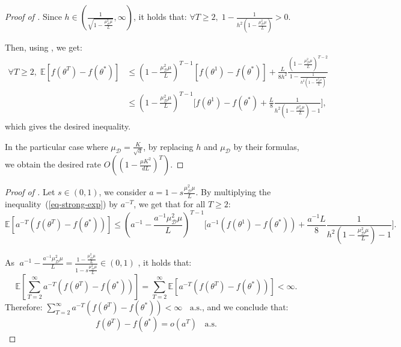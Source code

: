 \documentclass{article} %
\begin{document}
\begin{proof}[Proof of ]
Since $h \in \left(\frac{1}{\sqrt{1-\frac{\mu_{\mathcal{D}}^2 \mu}{L}}}, \infty \right)$, it holds that: $ \forall T \ge 2, \;  1-\frac{1}{h^2\left(1-\frac{\mu_{\mathcal{D}}^2 \mu}{L}\right)   } >0.$

Then, using , we get: 
\begin{align*}
\forall T \ge 2, \; 
\mathbb{E}[f(\theta^{T})-f(\theta^{*})  ]  &\leq\left(1-\frac{\mu_{\mathcal{D}}^2 \mu}{L}\right)^{T-1} [f(\theta^{1})-f(\theta^{*})  ]+\frac{L}{8h^2} \frac{ \left(1-\frac{\mu_{\mathcal{D}}^2 \mu}{L}\right)^{T-2}}{1- \frac{1}{h^2\left(1-\frac{\mu_{\mathcal{D}}^2 \mu}{L}\right)   } }   \\
&\label{eq-strong}\leq \left(1-\frac{\mu_{\mathcal{D}}^2 \mu}{L}\right)^{T-1} \bigg[f(\theta^{1})-f(\theta^{*}) 
+\frac{L}{8} 
\frac{ 1}{h^2 \left(1-\frac{\mu_{\mathcal{D}}^2 \mu}{L} \right)- 1 } \bigg],
\end{align*}
which gives the desired inequality. 

In the particular case where $\mu_{\mathcal{D}} = \frac{K}{\sqrt{d}}$, by replacing $h$ and $\mu_{\mathcal{D}}$ by their formulas, we obtain the desired rate $O\left(\left(1 - \frac{\mu K^2}{dL}\right)^T\right)$.
\end{proof}

\begin{proof}[Proof of ]

Let $s \in (0,1)$, we consider $a=1-s\frac{\mu_{\mathcal{D}}^2 \mu }{L}$. By multiplying the inequality~(\ref{eq-strong-exp}) by $a^{-T}$, we get that for all $T \ge 2$:
$$\mathbb{E}[a^{-T} \left( f(\theta^{T})-f(\theta^{*})  \right)]  
\le  \left(a^{-1}-\frac{a^{-1}\mu_{\mathcal{D}}^2 \mu}{L}\right)^{T-1} \bigg[a^{-1}\left(f(\theta^{1})-f(\theta^{*})\right) +\frac{a^{-1} L}{8} \frac{1}{h^2 \left(1-\frac{\mu_{\mathcal{D}}^2 \mu}{L} \right)- 1 }\bigg].$$

As  $\;a^{-1} - \frac{a^{-1} \mu_{\mathcal{D}}^2 \mu }{L} = \frac{1 - \frac{\mu_{\mathcal{D}}^2 \mu}{L}}{1 - s\frac{\mu_{\mathcal{D}}^2 \mu}{L}}  \in (0,1)$
, it holds that: $$\mathbb{E}[\sum_{T=2}^{\infty} a^{-T}\left(f(\theta^{T})-f(\theta^{*})\right) ] = \sum_{T=2}^{\infty}  \mathbb{E}[a^{-T}\left(f(\theta^{T})-f(\theta^{*})\right)] <\infty.$$ 
Therefore: $\sum_{T=2}^{\infty} a^{-T}\left(f(\theta^{T})-f(\theta^{*})\right) <\infty \;\; \text{ a.s.} $, and we conclude that: $$f(\theta^T)-f(\theta^{*}) =o\left(a^{T}\right)\;\; \text{ a.s.} $$
\end{proof}
\end{document}
